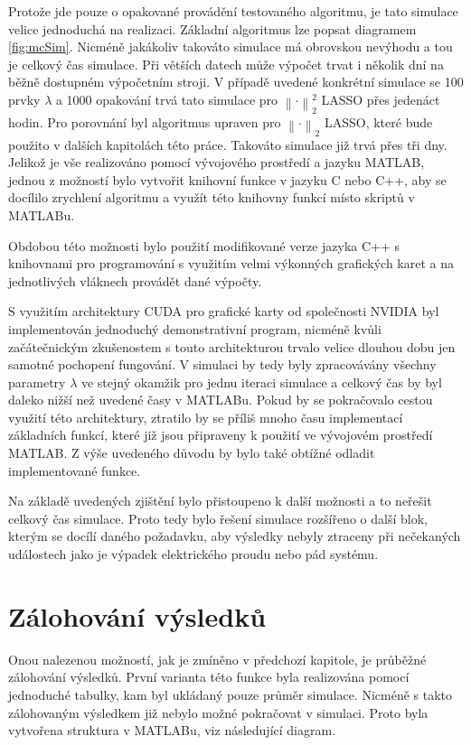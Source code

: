 \documentclass[FM,BP]{tulthesis}
\begin{document}
Protože jde pouze o opakované provádění testovaného algoritmu, je tato simulace velice jednoduchá na realizaci. Základní algoritmus lze popsat diagramem \ref{fig:mcSim}. Nicméně jakákoliv takováto simulace má obrovskou nevýhodu a tou je celkový čas simulace. Při větších datech může výpočet trvat i několik dní na běžně dostupném výpočetním stroji. V případě uvedené konkrétní simulace se 100 prvky $\lambda$ a 1000 opakování trvá tato simulace pro $\left\| \cdot\right\|_{2}^{2} $ LASSO přes jedenáct hodin. Pro porovnání byl algoritmus upraven pro $\left\| \cdot \right\|_2 $ LASSO, které bude použito v dalších kapitolách této práce. Takováto simulace již trvá přes tři dny. Jelikož je vše realizováno pomocí vývojového prostředí a jazyku MATLAB, jednou z možností bylo vytvořit knihovní funkce v jazyku C nebo C++, aby se docílilo zrychlení algoritmu a využít této knihovny funkcí místo skriptů v MATLABu.  

Obdobou této možnosti bylo použití modifikované verze jazyka C++ s knihovnami pro programování s využitím velmi výkonných grafických karet a na jednotlivých vláknech provádět dané výpočty. 

S využitím architektury CUDA pro grafické karty od společnosti NVIDIA byl implementován jednoduchý demonstrativní program, nicméně kvůli začátečnickým zkušenostem s touto architekturou trvalo velice dlouhou dobu jen samotné pochopení fungování. V simulaci by tedy byly zpracovávány všechny parametry $\lambda$ ve stejný okamžik pro jednu iteraci simulace a celkový čas by byl daleko nižší než uvedené časy v MATLABu. Pokud by se pokračovalo cestou využití této architektury, ztratilo by se příliš mnoho času implementací základních funkcí, které již jsou připraveny k použití ve vývojovém prostředí MATLAB. Z výše uvedeného důvodu by bylo také obtížné odladit implementované funkce. 

Na základě uvedených zjištění bylo přistoupeno k další možnosti a to neřešit celkový čas simulace. Proto tedy bylo řešení simulace rozšířeno o další blok, kterým se docílí daného požadavku, aby výsledky nebyly ztraceny při nečekaných událostech jako je výpadek elektrického proudu nebo pád systému.

\section{Zálohování výsledků}
\label{subch:backup}
Onou nalezenou možností, jak je zmíněno v předchozí kapitole, je průběžné zálohování výsledků. První varianta této funkce byla realizována pomocí jednoduché tabulky, kam byl ukládaný pouze průměr simulace. Nicméně s takto zálohovaným výsledkem již nebylo možné pokračovat v simulaci. Proto byla vytvořena struktura v MATLABu, viz následující diagram.
\end{document}
